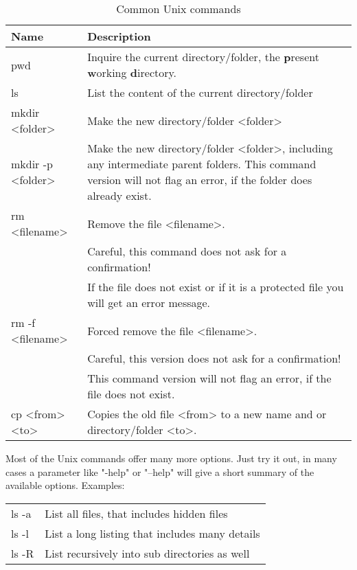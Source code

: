 \documentclass[11pt]{report}
\begin{document}
\begin{table}[!tbh]
\centering
\begin{tabularx}{\textwidth}{|p{50mm}|X|}
  \hline
  {\bf Name} &  {\bf Description} \\
  \hline \hline
   pwd & Inquire the current directory/folder, the
          {\bf p}resent {\bf w}orking {\bf d}irectory.\\
  \hline
   ls    & List the content of the current directory/folder\\
  \hline
   mkdir <folder> & Make the new directory/folder <folder> \\
  \hline
   mkdir -p <folder> & Make the new directory/folder <folder>,
         including any intermediate parent folders. 
         This command version will not flag an error,
         if the folder does already exist. \\
  \hline
   rm <filename> & Remove the file <filename>. \\
       & Careful, this command does not ask for 
         a confirmation! \\
       & If the file does not exist
         or if it is a protected file you will get an
         error message.\\
  \hline
   rm -f <filename> & Forced remove the file <filename>. \\
       & Careful, this version does not ask for a confirmation!\\
       & This command version will not flag an error,
         if the file does not exist. \\
  \hline
   cp <from> <to> & Copies the old file <from> to a new name and
         or directory/folder <to>.\\
  \hline
\end{tabularx}
\caption{\label{over-unix}Common Unix commands}
\end{table}

Most of the Unix commands offer many more options. Just try it 
out, in many cases a parameter like "-help" 
or "--help" will give a short summary of the available options.
Examples:

\begin{tabularx}{\textwidth}{p{25mm}X}
ls -a & List all files, that includes hidden files\\
ls -l & List a long listing that includes many details\\
ls -R & List recursively into sub directories as well\\
\end{tabularx}
\end{document}
